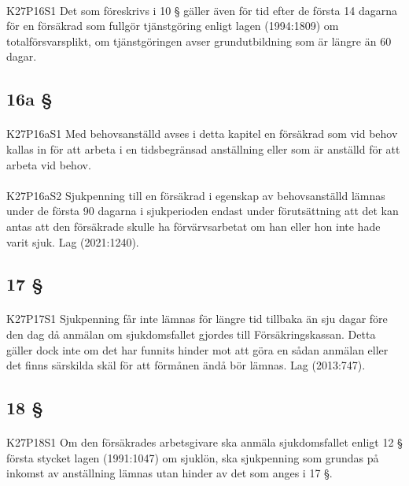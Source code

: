 \documentclass[a4paper,notitlepage,openany,10pt]{book}
\begin{document}
\paragraph*{}
{\tiny K27P16S1}
Det som föreskrivs i 10 § gäller även för tid efter de första 14 dagarna för en försäkrad som fullgör tjänstgöring enligt lagen (1994:1809) om totalförsvarsplikt, om tjänstgöringen avser grundutbildning som är längre än 60 dagar.
\subsection*{16a §}
\paragraph*{}
{\tiny K27P16aS1}
Med behovsanställd avses i detta kapitel en försäkrad som vid behov kallas in för att arbeta i en tidsbegränsad anställning eller som är anställd för att arbeta vid behov.
\paragraph*{}
{\tiny K27P16aS2}
Sjukpenning till en försäkrad i egenskap av behovsanställd lämnas under de första 90 dagarna i sjukperioden endast under förutsättning att det kan antas att den försäkrade skulle ha förvärvsarbetat om han eller hon inte hade varit sjuk.
Lag (2021:1240).
\subsection*{17 §}
\paragraph*{}
{\tiny K27P17S1}
Sjukpenning får inte lämnas för längre tid tillbaka än sju dagar före den dag då anmälan om sjukdomsfallet gjordes till Försäkringskassan. Detta gäller dock inte om det har funnits hinder mot att göra en sådan anmälan eller det finns särskilda skäl för att förmånen ändå bör lämnas.
Lag (2013:747).
\subsection*{18 §}
\paragraph*{}
{\tiny K27P18S1}
Om den försäkrades arbetsgivare ska anmäla sjukdomsfallet enligt 12 § första stycket lagen (1991:1047) om sjuklön, ska sjukpenning som grundas på inkomst av anställning lämnas utan hinder av det som anges i 17 §.
\end{document}
